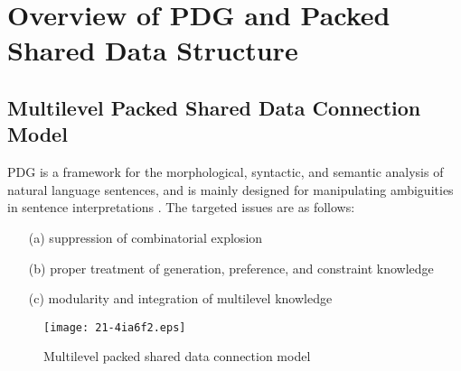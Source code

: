 \documentclass[english]{jnlp_1.4_rep}
\theoremstyle{break}
\theoremstyle{plain}
\theoremstyle{plain}
\begin{document}
\section{Overview of PDG and Packed Shared Data Structure}

\subsection{Multilevel Packed Shared Data Connection Model}

PDG is a framework for the morphological, syntactic, and semantic
analysis of natural language sentences, and is mainly designed for
manipulating ambiguities in sentence interpretations \cite{Hirakawa07}. The targeted
issues are as follows:

\begin{itemize}
\item[(a)] suppression of combinatorial explosion
\item[(b)] proper treatment of generation, preference, and constraint knowledge
\item[(c)] modularity and integration of multilevel knowledge 
\end{itemize}

\begin{figure}[b]
\vspace{-0.7\Cvs}
 \begin{center}
\texttt{[image: 21-4ia6f2.eps]}
 \end{center}
\caption{Multilevel packed shared data connection model}
\label{fig:MultilevelPSDataConnectionModel}
\end{figure}
\end{document}
